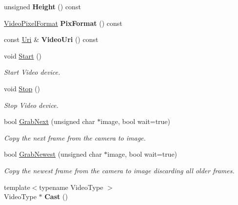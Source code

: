 \begin{DoxyCompactItemize}
\item 
unsigned {\bfseries Height} () const \hypertarget{structpangolin_1_1_video_input_a8b0be996cd715d4d3cf438c55d2a1b5d}{}\label{structpangolin_1_1_video_input_a8b0be996cd715d4d3cf438c55d2a1b5d}

\item 
\hyperlink{structpangolin_1_1_video_pixel_format}{Video\+Pixel\+Format} {\bfseries Pix\+Format} () const \hypertarget{structpangolin_1_1_video_input_a8fe6ba6e285f5fb0cd48318389b66d6b}{}\label{structpangolin_1_1_video_input_a8fe6ba6e285f5fb0cd48318389b66d6b}

\item 
const \hyperlink{classpangolin_1_1_uri}{Uri} \& {\bfseries Video\+Uri} () const \hypertarget{structpangolin_1_1_video_input_a7ab1db6dbfaed3823120d81a1c118415}{}\label{structpangolin_1_1_video_input_a7ab1db6dbfaed3823120d81a1c118415}

\item 
void \hyperlink{structpangolin_1_1_video_input_a74a2e3e1b87c7cbf9de9bcb39e1df128}{Start} ()\hypertarget{structpangolin_1_1_video_input_a74a2e3e1b87c7cbf9de9bcb39e1df128}{}\label{structpangolin_1_1_video_input_a74a2e3e1b87c7cbf9de9bcb39e1df128}

\begin{DoxyCompactList}\small\item\em Start Video device. \end{DoxyCompactList}\item 
void \hyperlink{structpangolin_1_1_video_input_a8945f80194cc7ec9594db7f27e7d09b8}{Stop} ()\hypertarget{structpangolin_1_1_video_input_a8945f80194cc7ec9594db7f27e7d09b8}{}\label{structpangolin_1_1_video_input_a8945f80194cc7ec9594db7f27e7d09b8}

\begin{DoxyCompactList}\small\item\em Stop Video device. \end{DoxyCompactList}\item 
bool \hyperlink{structpangolin_1_1_video_input_ad3d8ff59c1ec4139320097e6e1111f32}{Grab\+Next} (unsigned char $\ast$image, bool wait=true)
\begin{DoxyCompactList}\small\item\em Copy the next frame from the camera to image. \end{DoxyCompactList}\item 
bool \hyperlink{structpangolin_1_1_video_input_a4c8ac38e3c6a3f591663aeebf645e4c6}{Grab\+Newest} (unsigned char $\ast$image, bool wait=true)
\begin{DoxyCompactList}\small\item\em Copy the newest frame from the camera to image discarding all older frames. \end{DoxyCompactList}\item 
{\footnotesize template$<$typename Video\+Type $>$ }\\Video\+Type $\ast$ {\bfseries Cast} ()\hypertarget{structpangolin_1_1_video_input_aa8b7a3fe8cac4177b8112ccc1e10476a}{}\label{structpangolin_1_1_video_input_aa8b7a3fe8cac4177b8112ccc1e10476a}


\end{DoxyCompactItemize}
